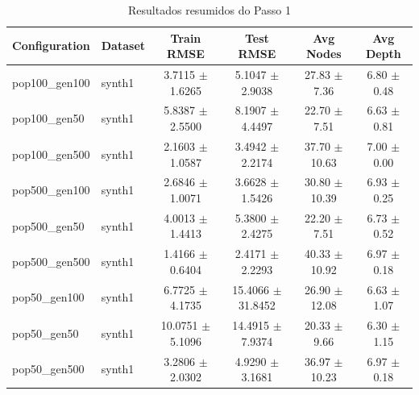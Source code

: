 \begin{table}[htbp]
  \centering
  \caption{Resultados resumidos do Passo 1}
  \label{tab:step1}
  \begin{tabular}{llcccc}
    \toprule
    Configuration & Dataset & Train RMSE & Test RMSE & Avg Nodes & Avg Depth \\
    \midrule
    pop100\_gen100 & synth1 & 3.7115 $\pm$ 1.6265 & 5.1047 $\pm$ 2.9038 & 27.83 $\pm$ 7.36 & 6.80 $\pm$ 0.48 \\
    pop100\_gen50 & synth1 & 5.8387 $\pm$ 2.5500 & 8.1907 $\pm$ 4.4497 & 22.70 $\pm$ 7.51 & 6.63 $\pm$ 0.81 \\
    pop100\_gen500 & synth1 & 2.1603 $\pm$ 1.0587 & 3.4942 $\pm$ 2.2174 & 37.70 $\pm$ 10.63 & 7.00 $\pm$ 0.00 \\
    pop500\_gen100 & synth1 & 2.6846 $\pm$ 1.0071 & 3.6628 $\pm$ 1.5426 & 30.80 $\pm$ 10.39 & 6.93 $\pm$ 0.25 \\
    pop500\_gen50 & synth1 & 4.0013 $\pm$ 1.4413 & 5.3800 $\pm$ 2.4275 & 22.20 $\pm$ 7.51 & 6.73 $\pm$ 0.52 \\
    pop500\_gen500 & synth1 & 1.4166 $\pm$ 0.6404 & 2.4171 $\pm$ 2.2293 & 40.33 $\pm$ 10.92 & 6.97 $\pm$ 0.18 \\
    pop50\_gen100 & synth1 & 6.7725 $\pm$ 4.1735 & 15.4066 $\pm$ 31.8452 & 26.90 $\pm$ 12.08 & 6.63 $\pm$ 1.07 \\
    pop50\_gen50 & synth1 & 10.0751 $\pm$ 5.1096 & 14.4915 $\pm$ 7.9374 & 20.33 $\pm$ 9.66 & 6.30 $\pm$ 1.15 \\
    pop50\_gen500 & synth1 & 3.2806 $\pm$ 2.0302 & 4.9290 $\pm$ 3.1681 & 36.97 $\pm$ 10.23 & 6.97 $\pm$ 0.18 \\
    \bottomrule
  \end{tabular}
\end{table}
